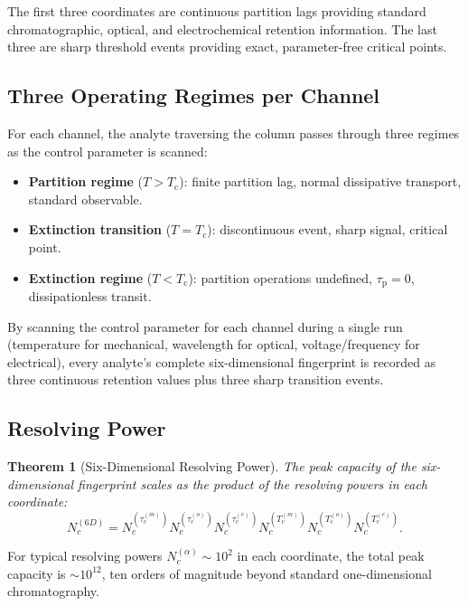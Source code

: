 \documentclass[twocolumn,10pt,a4paper]{article}
\newtheorem{theorem}{Theorem}[section]
\theoremstyle{definition}
\theoremstyle{remark}
\newcommand{\Tcrit}{T_{\mathrm{c}}}
\newcommand{\tauP}{\tau_{\mathrm{p}}}
\newcommand{\tauM}{\tau_{\mathrm{c}}^{(m)}}
\newcommand{\tauO}{\tau_{\mathrm{c}}^{(o)}}
\newcommand{\tauE}{\tau_{\mathrm{c}}^{(e)}}
\newcommand{\TcM}{T_{\mathrm{c}}^{(m)}}
\newcommand{\TcO}{T_{\mathrm{c}}^{(o)}}
\newcommand{\TcE}{T_{\mathrm{c}}^{(e)}}
\begin{document}
The first three coordinates are continuous partition lags providing standard chromatographic, optical, and electrochemical retention information. The last three are sharp threshold events providing exact, parameter-free critical points.

\subsection{Three Operating Regimes per Channel}

For each channel, the analyte traversing the column passes through three regimes as the control parameter is scanned:

\begin{itemize}[leftmargin=1.2em,nosep]
\item \textbf{Partition regime} ($T > \Tcrit$): finite partition lag, normal dissipative transport, standard observable.
\item \textbf{Extinction transition} ($T = \Tcrit$): discontinuous event, sharp signal, critical point.
\item \textbf{Extinction regime} ($T < \Tcrit$): partition operations undefined, $\tauP = 0$, dissipationless transit.
\end{itemize}

By scanning the control parameter for each channel during a single run (temperature for mechanical, wavelength for optical, voltage/frequency for electrical), every analyte's complete six-dimensional fingerprint is recorded as three continuous retention values plus three sharp transition events.

\subsection{Resolving Power}

\begin{theorem}[Six-Dimensional Resolving Power]
\label{thm:resolving_power}
The peak capacity of the six-dimensional fingerprint scales as the product of the resolving powers in each coordinate:
\begin{equation}
N_c^{(6D)} = N_c^{(\tauM)} N_c^{(\tauO)} N_c^{(\tauE)} N_c^{(\TcM)} N_c^{(\TcO)} N_c^{(\TcE)}.
\label{eq:peak_capacity_6d}
\end{equation}
\end{theorem}

For typical resolving powers $N_c^{(\alpha)} \sim 10^2$ in each coordinate, the total peak capacity is $\sim 10^{12}$, ten orders of magnitude beyond standard one-dimensional chromatography.
\end{document}
